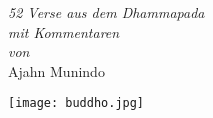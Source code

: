 
\vspace*{1em}

{\centering

{\itshape 52 Verse aus dem Dhammapada\\
mit Kommentaren\\
von}\\[0.4\baselineskip]
Ajahn Munindo

\vfill

\texttt{[image: buddho.jpg]}
\vspace*{1.3em}


}
